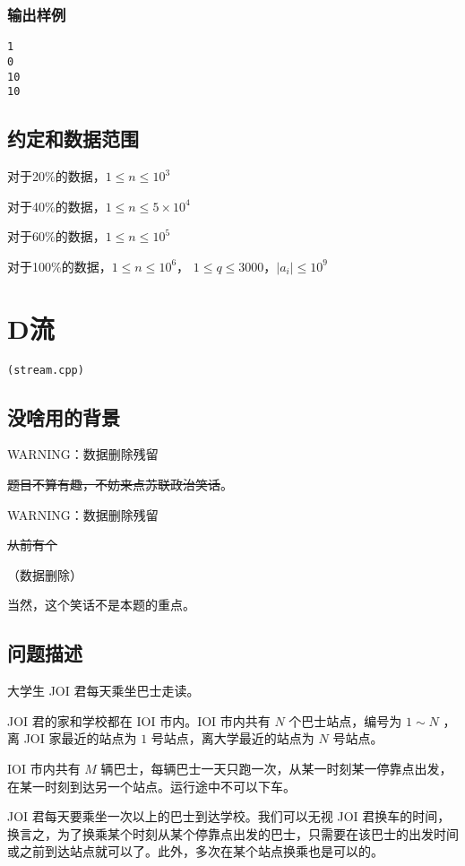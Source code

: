 \documentclass[UTF8]{ctexart}
\begin{document}
\subsubsection{输出样例}

\begin{lstlisting}
1
0
10
10
\end{lstlisting}


\subsection{约定和数据范围}

对于20\%的数据，$1\le n \le 10^3$

对于40\%的数据，$1\le n \le 5\times 10^4$

对于60\%的数据，$1\le n \le 10^5$

对于100\%的数据，$1\le n \le 10^6$， $1\le q\le 3000$，$|a_i| \le 10^9$


\newpage
\section{D流}
\begin{center}
\tt\large{(stream.cpp)}
\end{center}

\subsection{没啥用的背景}

WARNING：数据删除残留

\sout{题目不算有趣，不妨来点苏联政治笑话}。

WARNING：数据删除残留

\sout{从前有个}

（数据删除）

当然，这个笑话不是本题的重点。

\subsection{问题描述}

大学生 JOI 君每天乘坐巴士走读。

JOI 君的家和学校都在 IOI 市内。IOI 市内共有 $N$ 个巴士站点，编号为 $1\sim N$ ，离 JOI 家最近的站点为 $1$ 号站点，离大学最近的站点为 $N$ 号站点。

IOI 市内共有 $M$ 辆巴士，每辆巴士一天只跑一次，从某一时刻某一停靠点出发，在某一时刻到达另一个站点。运行途中不可以下车。

JOI 君每天要乘坐一次以上的巴士到达学校。我们可以无视 JOI 君换车的时间，换言之，为了换乘某个时刻从某个停靠点出发的巴士，只需要在该巴士的出发时间或之前到达站点就可以了。此外，多次在某个站点换乘也是可以的。
\end{document}
